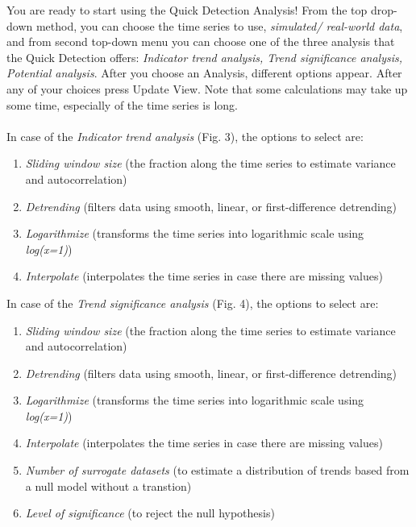 \documentclass[12pt,a4paper,final]{article}
\begin{document}
\begin{doublespacing}
You are ready to start using the Quick Detection Analysis! From the top drop-down method, you can choose the time series to use, \textit{simulated/ real-world data}, and from second top-down menu you can choose one of the three analysis that the Quick Detection offers: \textit{Indicator trend analysis, Trend significance analysis, Potential analysis}. After you choose an Analysis, different options appear. After any of your choices press Update View. Note that some calculations may take up some time, especially of the time series is long.
\\
\\
In case of the \textit{Indicator trend analysis} (Fig. 3), the options to select are:
\begin{enumerate}
\item \textit{Sliding window size} (the fraction along the time series to estimate variance and autocorrelation)
\item  \textit{Detrending} (filters data using smooth, linear, or first-difference detrending)
\item \textit{Logarithmize} (transforms the time series into logarithmic scale using \textit{log(x=1)})
\item \textit{Interpolate} (interpolates the time series in case there are missing values)
\end{enumerate}

\newpage
In case of the \textit{Trend significance analysis} (Fig. 4), the options to select are:
\begin{enumerate}
\item \textit{Sliding window size} (the fraction along the time series to estimate variance and autocorrelation)
\item  \textit{Detrending} (filters data using smooth, linear, or first-difference detrending)
\item \textit{Logarithmize} (transforms the time series into logarithmic scale using \textit{log(x=1)})
\item \textit{Interpolate} (interpolates the time series in case there are missing values)
\item \textit{Number of surrogate datasets} (to estimate a distribution of trends based from a null model without a transtion)
\item \textit{Level of significance} (to reject the null hypothesis)
\end{enumerate}


\end{doublespacing}
\end{document}

